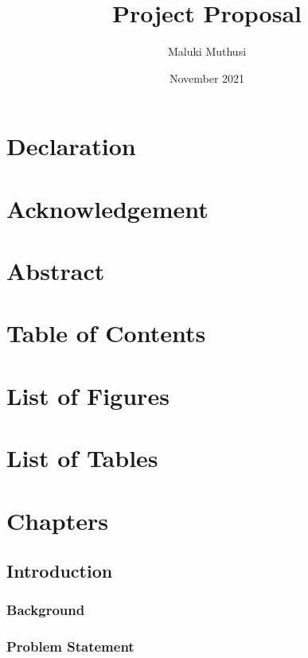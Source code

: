 \documentclass{report}
\title{Project Proposal}
\author{Maluki Muthusi}
\date{November 2021}
\begin{document}


%
\section{Declaration}

%
\section{Acknowledgement}

%
\section{Abstract}


%
\section{Table of Contents}

%
\section{List of Figures}

%
\section{List of Tables}

\section{Chapters}

\subsection{Introduction}


\subsubsection{Background}


\subsubsection{Problem Statement}

\end{document}
